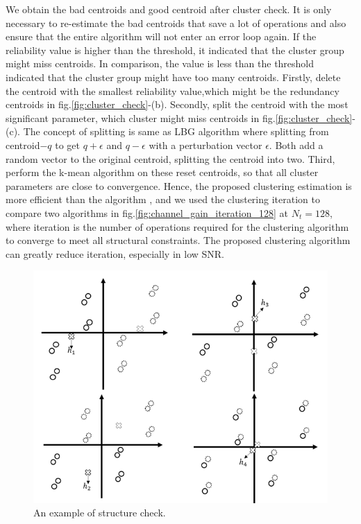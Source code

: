 We obtain the bad centroids and good centroid after cluster check. It is only necessary to re-estimate the bad centroids that save a lot of operations and also ensure that the entire algorithm will not enter an error loop again.  If the reliability value is higher than the threshold, it indicated that the cluster group might miss centroids. In comparison, the value is less than the threshold indicated that the cluster group might have too many centroids. Firstly, delete the centroid with the smallest reliability value,which might be the redundancy centroids in fig.\ref{fig:cluster_check}-(b). Secondly, split the centroid with the most significant parameter, which cluster might miss centroids in fig.\ref{fig:cluster_check}-(c). The concept of splitting is same as LBG \cite{lbg80} algorithm where splitting from centroid$-q$ to get $q+\epsilon$ and $q-\epsilon$ with a perturbation vector $\epsilon$. Both add a random vector to the original centroid, splitting the centroid into two. 
Third, perform the k-mean algorithm on these reset centroids, so that all cluster parameters are close to convergence. Hence, the proposed clustering estimation is more efficient than the algorithm \cite{hsu2020uplink}, and we used the clustering iteration to compare two algorithms in fig.\ref{fig:channel_gain_iteration_128} at $N_t=128$, where iteration is the number of operations required for the clustering algorithm to converge to meet all structural constraints. The proposed clustering algorithm can greatly reduce iteration, especially in low SNR.


\begin{figure}[t!]
 \centering
 \includegraphics[width=15cm]{fig/structure_check.png}
 \caption{An example of structure check.}
 \label{fig:structure_check}
\end{figure}


